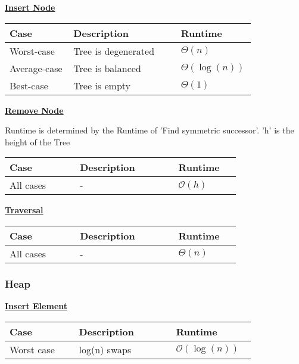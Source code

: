         {\centering\underline{\textbf{Insert Node}} \par}
        \begin{tabular*}{\linewidth}{| p{0.25\linewidth} | p{0.42\linewidth} | p{0.15\linewidth} |}
            \hline
            Case & Description & Runtime\\
            \hline \hline
            Worst-case & Tree is degenerated & $\Theta(n)$ \\
            \hline
            Average-case & Tree is balanced & $\Theta(\log(n))$ \\
            \hline
            Best-case & Tree is empty & $\Theta(1)$ \\
            \hline
        \end{tabular*}

        {\centering\underline{\textbf{Remove Node}} \par}
        Runtime is determined by the Runtime of 'Find symmetric successor'. 'h' is the height of the Tree\\
        \begin{tabular*}{\linewidth}{| p{0.25\linewidth} | p{0.35\linewidth} | p{0.22\linewidth} |}
            \hline
            Case & Description & Runtime\\
            \hline \hline
            All cases & - & $\mathcal{O}(h)$ \\
            \hline
        \end{tabular*}

        {\centering\underline{\textbf{Traversal}} \par}
        \begin{tabular*}{\linewidth}{| p{0.25\linewidth} | p{0.35\linewidth} | p{0.22\linewidth} |}
            \hline
            Case & Description & Runtime\\
            \hline \hline
            All cases & - & $\Theta (n)$ \\
            \hline
        \end{tabular*}
        
    \subsubsection{Heap}
        {\centering\underline{\textbf{Insert Element}} \par}
        \begin{tabular*}{\linewidth}{| p{0.25\linewidth} | p{0.35\linewidth} | p{0.22\linewidth} |}
            \hline
            Case & Description & Runtime\\
            \hline \hline
            Worst case & log(n) swaps & $\mathcal{O}(\log(n))$ \\
            \hline
        \end{tabular*}

